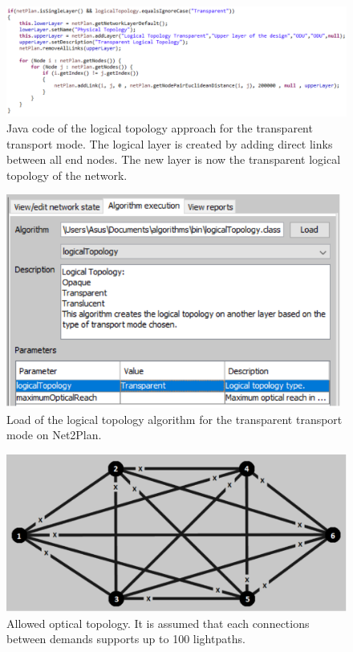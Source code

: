 \begin{figure}[H]
\centering
\includegraphics[width=15cm]{sdf/heuristic/transparent_survivability/figures/logical_topology_creation_transparent}
\caption{Java code of the logical topology approach for the transparent transport mode. The logical layer is created by adding direct links between all end nodes. The new layer is now the transparent logical topology of the network.}
\label{logical_topology_creation_transparent}
\end{figure}

\begin{figure}[H]
\centering
\includegraphics[width=11cm]{sdf/heuristic/transparent_survivability/figures/logical_topology_load_transparent}
\caption{Load of the logical topology algorithm for the transparent transport mode on Net2Plan.}
\label{logical_topology_load_transparent}
\end{figure}

\begin{figure}[H]
\centering
\includegraphics[width=13cm]{sdf/heuristic/transparent_survivability/figures/allowed_optical}
\caption{Allowed optical topology. It is assumed that each connections between demands supports up to 100 lightpaths.}
\label{allowed_optical_surv_transparent}
\end{figure}


